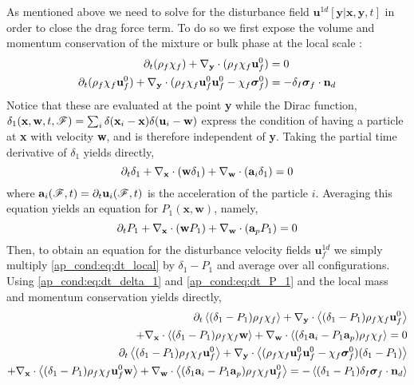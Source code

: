 As mentioned above we need to solve for the disturbance field $\textbf{u}^{1d}[\textbf{y}|\textbf{x},\textbf{y},t]$ in order to close the drag force term. 
To do so we first expose the volume and momentum conservation of the mixture or bulk phase at the local scale :
\begin{align}
    \partial_t (\rho_f\chi_f) +  {\mathbf{\nabla}_\textbf{y}} \cdot (\rho_f\chi_f\textbf{u}^0_f) &= 0 \\
    \partial_t (\rho_f\chi_f\textbf{u}^0_f)
    + {\mathbf{\nabla}_\textbf{y}}\cdot (\rho_f\chi_f\textbf{u}^0_f\textbf{u}^0_f - \chi_f\bm\sigma^0_f)
    &= - \delta_I \bm\sigma_f \cdot \textbf{n}_d  
    \label{ap_cond:eq:dt_local}
\end{align}
Notice that these are evaluated at the point \textbf{y} while the Dirac function, $\delta_1(\textbf{x},\textbf{w},t,\mathscr{F}) = \sum_i \delta(\textbf{x}_i-\textbf{x})\delta(\textbf{u}_i - \textbf{w})$ express the condition of having a particle at \textbf{x} with velocity \textbf{w}, and is therefore independent of \textbf{y}. 
Taking the partial time derivative of $\delta_1$ yields directly, 
\begin{equation}
    \partial_t\delta_1 
    + {\mathbf{\nabla}_\textbf{x}}\cdot(\textbf{w}\delta_1)
    + {\mathbf{\nabla}_\textbf{w}}\cdot(\textbf{a}_i\delta_1)
    = 0 
    \label{ap_cond:eq:dt_delta_1}
\end{equation}
where $\textbf{a}_i(\mathscr{F},t) = \partial_t \textbf{u}_i(\mathscr{F},t)$ is the acceleration of the particle $i$. 
Averaging this equation yields an equation for  $P_1(\textbf{x},\textbf{w})$, namely, 
\begin{equation}
    \partial_t P_1 
    + {\mathbf{\nabla}_\textbf{x}}\cdot(\textbf{w} P_1)
    + {\mathbf{\nabla}_\textbf{w}}\cdot(\textbf{a}_p P_1)
    = 0 
    \label{ap_cond:eq:dt_P_1}
\end{equation}
Then, to obtain an equation for the disturbance velocity fields $\textbf{u}^{1d}_f$ we simply multiply \ref{ap_cond:eq:dt_local} by $\delta_1 - P_1$ and average over all configurations. 
Using \ref{ap_cond:eq:dt_delta_1} and \ref{ap_cond:eq:dt_P_1} and the local mass and momentum conservation yields directly, 
\begin{align}
    \partial_t \left<(\delta_1 - P_1)\rho_f\chi_f\right>
    + {\mathbf{\nabla}_\textbf{y}}\cdot \left<(\delta_1 - P_1)\rho_f\chi_f\textbf{u}^0_f\right> \nonumber \\
    + {\mathbf{\nabla}_\textbf{x}}\cdot \left<(\delta_1 - P_1)\rho_f \chi_f \textbf{w}\right>
    + {\mathbf{\nabla}_\textbf{w}}\cdot \left<(\delta_1\textbf{a}_i - P_1\textbf{a}_p)\rho_f \chi_f \right>
    = 0 
    \label{ap_cond:eq:conditional_eqs_mass}
    \\
    \partial_t \left<(\delta_1 - P_1)\rho_f \chi_f \textbf{u}^0_f\right>
    + {\mathbf{\nabla}_\textbf{y}}\cdot \left<(\rho_f \chi_f \textbf{u}^0_f\textbf{u}^0_f- \chi_f \bm\sigma^0_f )(\delta_1 - P_1)\right> \nonumber \\ 
    + {\mathbf{\nabla}_\textbf{x}}\cdot \left<(\delta_1 - P_1)\rho_f \chi_f \textbf{u}^0_f\textbf{w}\right>
    + {\mathbf{\nabla}_\textbf{w}}\cdot \left<(\delta_1\textbf{a}_i - P_1\textbf{a}_p)\rho_f \chi_f \textbf{u}^0_f\right>
    = - \left<(\delta_1 - P_1)\delta_I \bm\sigma_f \cdot \textbf{n}_d\right>
    \label{ap_cond:eq:conditional_eqs}
\end{align}
